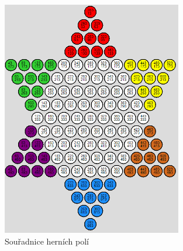 \begin{figure}
	\centering
	\includegraphics[width=0.7\textwidth]{Figures/SouradnicePoli.png}
	\caption{Souřadnice herních polí}
    \label{fig:SouradnicePoli}
\end{figure}

